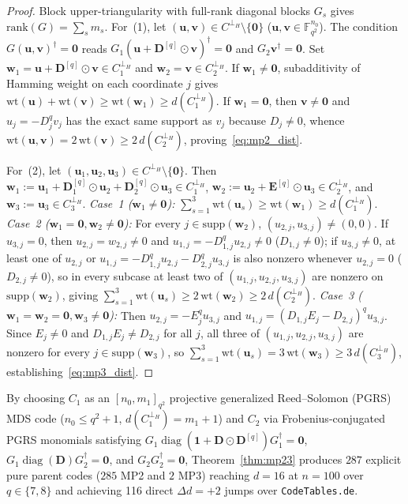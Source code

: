 \documentclass[11pt,a4paper]{article}
\newcommand{\vb}[1]{\symbf{#1}}
\newcommand{\vb}[1]{\mathbf{#1}}
\theoremstyle{remark}
\begin{document}
\begin{proof}
Block upper-triangularity with full-rank diagonal blocks $G_s$ gives $\mathrm{rank}(G) = \sum_s m_s$. For~(1), let $(\vb{u}, \vb{v}) \in C^{\perp_H} \setminus \{\vb{0}\}$ ($\vb{u}, \vb{v} \in \mathbb{F}_{q^2}^{n_0}$). The condition $G (\vb{u}, \vb{v})^\dagger = \vb{0}$ reads $G_1(\vb{u} + \vb{D}^{[q]} \odot \vb{v})^\dagger = \vb{0}$ and $G_2 \vb{v}^\dagger = \vb{0}$. Set $\vb{w}_1 = \vb{u} + \vb{D}^{[q]} \odot \vb{v} \in C_1^{\perp_H}$ and $\vb{w}_2 = \vb{v} \in C_2^{\perp_H}$. If $\vb{w}_1 \ne \vb{0}$, subadditivity of Hamming weight on each coordinate $j$ gives $\mathrm{wt}(\vb{u}) + \mathrm{wt}(\vb{v}) \ge \mathrm{wt}(\vb{w}_1) \ge d(C_1^{\perp_H})$. If $\vb{w}_1 = \vb{0}$, then $\vb{v} \ne \vb{0}$ and $u_j = -D_j^q v_j$ has the exact same support as $v_j$ because $D_j \ne 0$, whence $\mathrm{wt}(\vb{u}, \vb{v}) = 2\,\mathrm{wt}(\vb{v}) \ge 2\,d(C_2^{\perp_H})$, proving~\eqref{eq:mp2_dist}.

For~(2), let $(\vb{u}_1, \vb{u}_2, \vb{u}_3) \in C^{\perp_H} \setminus \{\vb{0}\}$. Then $\vb{w}_1 := \vb{u}_1 + \vb{D}_1^{[q]} \odot \vb{u}_2 + \vb{D}_2^{[q]} \odot \vb{u}_3 \in C_1^{\perp_H}$, $\vb{w}_2 := \vb{u}_2 + \vb{E}^{[q]} \odot \vb{u}_3 \in C_2^{\perp_H}$, and $\vb{w}_3 := \vb{u}_3 \in C_3^{\perp_H}$.
\emph{Case~1 ($\vb{w}_1 \ne \vb{0}$):} $\sum_{s=1}^3 \mathrm{wt}(\vb{u}_s) \ge \mathrm{wt}(\vb{w}_1) \ge d(C_1^{\perp_H})$.
\emph{Case~2 ($\vb{w}_1 = \vb{0}, \vb{w}_2 \ne \vb{0}$):} For every $j \in \mathrm{supp}(\vb{w}_2)$, $(u_{2,j}, u_{3,j}) \ne (0, 0)$. If $u_{3,j} = 0$, then $u_{2,j} = w_{2,j} \ne 0$ and $u_{1,j} = -D_{1,j}^q u_{2,j} \ne 0$ ($D_{1,j} \ne 0$); if $u_{3,j} \ne 0$, at least one of $u_{2,j}$ or $u_{1,j} = -D_{1,j}^q u_{2,j} - D_{2,j}^q u_{3,j}$ is also nonzero whenever $u_{2,j} = 0$ ($D_{2,j} \ne 0$), so in every subcase at least two of $(u_{1,j}, u_{2,j}, u_{3,j})$ are nonzero on $\mathrm{supp}(\vb{w}_2)$, giving $\sum_{s=1}^3 \mathrm{wt}(\vb{u}_s) \ge 2\,\mathrm{wt}(\vb{w}_2) \ge 2\,d(C_2^{\perp_H})$.
\emph{Case~3 ($\vb{w}_1 = \vb{w}_2 = \vb{0}, \vb{w}_3 \ne \vb{0}$):} Then $u_{2,j} = -E_j^q u_{3,j}$ and $u_{1,j} = (D_{1,j} E_j - D_{2,j})^q u_{3,j}$. Since $E_j \ne 0$ and $D_{1,j} E_j \ne D_{2,j}$ for all $j$, all three of $(u_{1,j}, u_{2,j}, u_{3,j})$ are nonzero for every $j \in \mathrm{supp}(\vb{w}_3)$, so $\sum_{s=1}^3 \mathrm{wt}(\vb{u}_s) = 3\,\mathrm{wt}(\vb{w}_3) \ge 3\,d(C_3^{\perp_H})$, establishing~\eqref{eq:mp3_dist}.
\end{proof}

By choosing $C_1$ as an $[n_0, m_1]_{q^2}$ projective generalized Reed--Solomon (PGRS) MDS code ($n_0 \le q^2 + 1$, $d(C_1^{\perp_H}) = m_1 + 1$) and $C_2$ via Frobenius-conjugated PGRS monomials satisfying $G_1 \operatorname{diag}(\vb{1} + \vb{D}\odot\vb{D}^{[q]}) G_1^\dagger = \vb{0}$, $G_1 \operatorname{diag}(\vb{D}) G_2^\dagger = \vb{0}$, and $G_2 G_2^\dagger = \vb{0}$, Theorem~\ref{thm:mp23} produces $287$ explicit pure parent codes ($285$ MP2 and $2$ MP3) reaching $d = 16$ at $n = 100$ over $q \in \{7, 8\}$ and achieving 116 direct $\Delta d = +2$ jumps over \texttt{CodeTables.de}.
\end{document}
